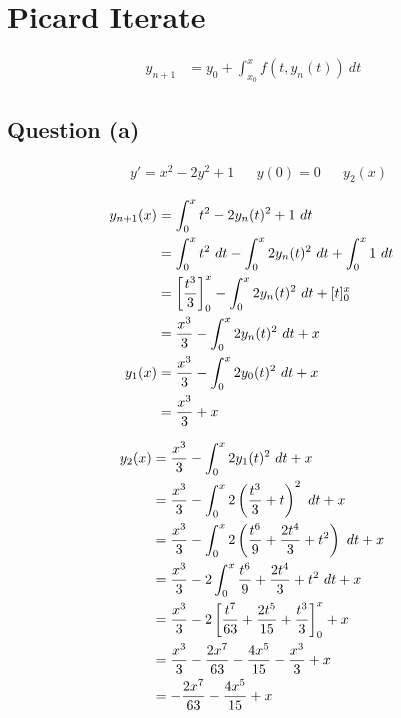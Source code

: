 \section{Picard Iterate}
	\begin{align}
		y_{n+1} &= y_{0} + \int_{x_{0}}^{x} f(t,y_{n}(t)) \ dt&
	\end{align}

	\subsection{Question (a)}
		\begin{align}
			&y' = x^{2} - 2y^{2} + 1&
			&y(0) = 0&
			&y_{2}(x)&
		\end{align}

		\begin{align}
			y_{n+1}(x) &= \int_{0}^{x} t^{2} - 2y_{n}(t)^{2} + 1 \ dt& \\
			&= \int_{0}^{x} t^{2} \ dt - \int_{0}^{x} 2y_{n}(t)^{2} \ dt + \int_{0}^{x} 1 \ dt& \notag \\
			&= \left[ \frac{t^{3}}{3} \right]_{0}^{x} - \int_{0}^{x} 2y_{n}(t)^{2} \ dt + [t]_{0}^{x}& \notag \\
			&= \frac{x^{3}}{3} - \int_{0}^{x} 2y_{n}(t)^{2} \ dt + x& \\
			y_{1}(x) &= \frac{x^{3}}{3} - \int_{0}^{x} 2y_{0}(t)^{2} \ dt + x& \\
			&= \frac{x^{3}}{3} + x&
		\end{align}

		\begin{align}
			y_{2}(x) &= \frac{x^{3}}{3} - \int_{0}^{x} 2y_{1}(t)^{2} \ dt + x& \\
			&= \frac{x^{3}}{3} - \int_{0}^{x} 2\left(\frac{t^{3}}{3} + t\right)^{2} \ dt + x& \notag \\
			&= \frac{x^{3}}{3} - \int_{0}^{x} 2\left(\frac{t^{6}}{9} + \frac{2t^{4}}{3} + t^{2}\right) \ dt + x& \notag \\
			&= \frac{x^{3}}{3} - 2\int_{0}^{x} \frac{t^{6}}{9} + \frac{2t^{4}}{3} + t^{2} \ dt + x& \notag \\
			&= \frac{x^{3}}{3} - 2\left[\frac{t^{7}}{63} + \frac{2t^{5}}{15} + \frac{t^{3}}{3}\right]_{0}^{x} + x& \notag \\
			&= \frac{x^{3}}{3} - \frac{2x^{7}}{63} - \frac{4x^{5}}{15} - \frac{x^{3}}{3} + x& \notag \\
			&= - \frac{2x^{7}}{63} - \frac{4x^{5}}{15} + x&
		\end{align}

